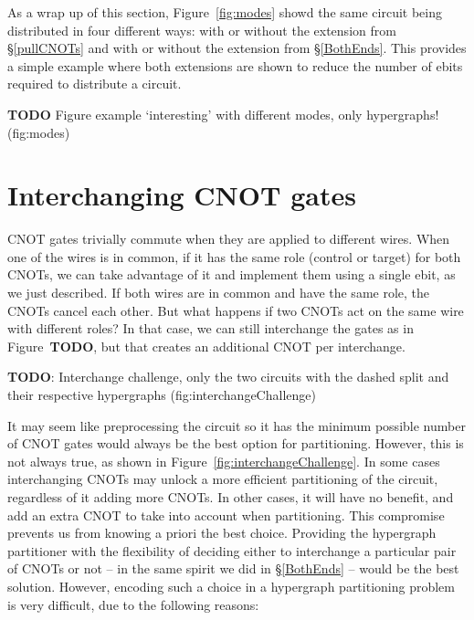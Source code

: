 As a wrap up of this section, Figure~\ref{fig:modes} showd the same circuit being distributed in four different ways: with or without the extension from \S\ref{pullCNOTs} and with or without the extension from \S\ref{BothEnds}. This provides a simple example where both extensions are shown to reduce the number of ebits required to distribute a circuit.

\textbf{TODO} Figure example `interesting' with different modes, only hypergraphs! (fig:modes)

\section{Interchanging CNOT gates}

CNOT gates trivially commute when they are applied to different wires. When one of the wires is in common, if it has the same role (control or target) for both CNOTs, we can take advantage of it and implement them using a single ebit, as we just described. If both wires are in common and have the same role, the CNOTs cancel each other. But what happens if two CNOTs act on the same wire with different roles? In that case, we can still interchange the gates as in Figure~\textbf{TODO}, but that creates an additional CNOT per interchange.

\textbf{TODO}: Interchange challenge, only the two circuits with the dashed split and their respective hypergraphs (fig:interchangeChallenge)

It may seem like preprocessing the circuit so it has the minimum possible number of CNOT gates would always be the best option for partitioning. However, this is not always true, as shown in Figure~\ref{fig:interchangeChallenge}. In some cases interchanging CNOTs may unlock a more efficient partitioning of the circuit, regardless of it adding more CNOTs. In other cases, it will have no benefit, and add an extra CNOT to take into account when partitioning. This compromise prevents us from knowing a priori the best choice. Providing the hypergraph partitioner with the flexibility of deciding either to interchange a particular pair of CNOTs or not -- in the same spirit we did in \S\ref{BothEnds} -- would be the best solution. However, encoding such a choice in a hypergraph partitioning problem is very difficult, due to the following reasons:

